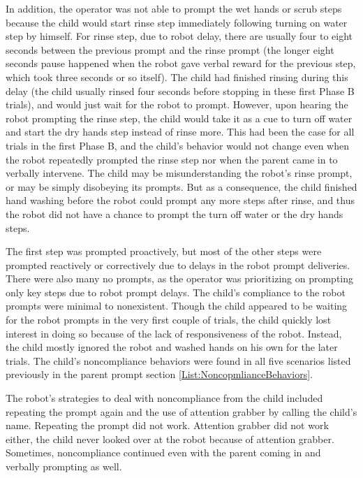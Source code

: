 In addition, the operator was not able to prompt the wet hands or scrub steps because the child would start rinse step immediately following turning on water step by himself.  For rinse step, due to robot delay, there are usually four to eight seconds between the previous prompt and the rinse prompt (the longer eight seconds pause happened when the robot gave verbal reward for the previous step, which took three seconds or so itself).  The child had finished rinsing during this delay (the child usually rinsed four seconds before stopping in these first Phase B trials), and would just wait for the robot to prompt.  However, upon hearing the robot prompting the rinse step, the child would take it as a cue to turn off water and start the dry hands step instead of rinse more.  This had been the case for all trials in the first Phase B, and the child's behavior would not change even when the robot repeatedly prompted the rinse step nor when the parent came in to verbally intervene.  The child may be misunderstanding the robot's rinse prompt, or may be simply disobeying its prompts.  But as a consequence, the child finished hand washing before the robot could prompt any more steps after rinse, and thus the robot did not have a chance to prompt the turn off water or the dry hands steps.

The first step was prompted proactively, but most of the other steps were prompted reactively or correctively due to delays in the robot prompt deliveries.  There were also many no prompts, as the operator was prioritizing on prompting only key steps due to robot prompt delays.  The child's compliance to the robot prompts were minimal to nonexistent.  Though the child appeared to be waiting for the robot prompts in the very first couple of trials, the child quickly lost interest in doing so because of the lack of responsiveness of the robot.  Instead, the child mostly ignored the robot and washed hands on his own for the later trials.  The child's noncompliance behaviors were found in all five scenarios listed previously in the parent prompt section \ref{List:NoncopmlianceBehaviors}.

The robot's strategies to deal with noncompliance from the child included repeating the prompt again and the use of attention grabber by calling the child's name.  Repeating the prompt did not work.  Attention grabber did not work either, the child never looked over at the robot because of attention grabber.  Sometimes, noncompliance continued even with the parent coming in and verbally prompting as well.


